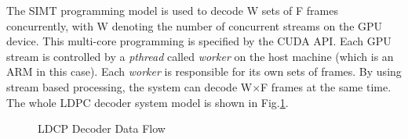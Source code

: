\documentclass[10pt,a4paper]{article}
\begin{document}
The SIMT programming model is used to decode W sets of F frames concurrently, with W denoting the number of concurrent streams on the GPU device. This multi-core programming is specified by the CUDA API. Each GPU stream is controlled by a \textit{pthread} called \textit{worker} on the host machine (which is an ARM in this case). Each \textit{worker} is responsible for its own sets of frames. By using stream based processing, the system can decode W$\times$F frames at the same time. The whole LDPC decoder system model is shown in Fig.\ref{fig_total}.
\noindent
\begin{figure}[H]
\begin{centering}
\caption[width=.3\textwidth]{LDCP Decoder Data Flow}
\label{fig_total}
\end{centering}
\end{figure}
\end{document}
